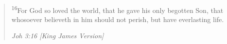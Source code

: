 \begin{quote}
\textsuperscript{16}For God so loved the world, that he gave his only begotten Son, that whosoever believeth in him should not perish, but have everlasting life.
\begin{flushright}
\emph{Joh 3:16 [King James Version]}
\end{flushright}
\end{quote}